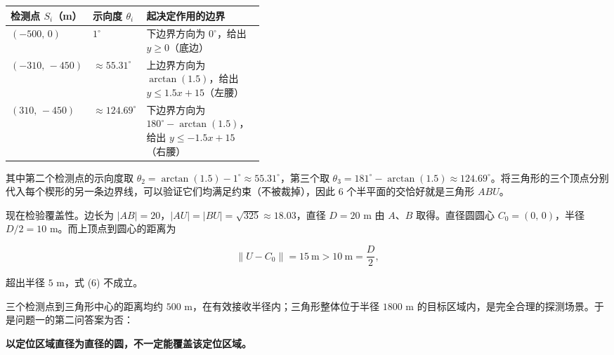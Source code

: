 \documentclass[UTF8,a4paper,zihao=-4,fontset=fandol]{ctexart}
\begin{document}
\begin{center}
\renewcommand{\arraystretch}{1.3}
\begin{tabularx}{0.98\linewidth}{>{\centering\arraybackslash}p{0.22\linewidth}>{\centering\arraybackslash}p{0.20\linewidth}>{\raggedright\arraybackslash}X}
\toprule
\textbf{检测点 $S_i$（m）} & \textbf{示向度 $\theta_i$} & \textbf{起决定作用的边界} \\
\midrule
$(-500,\,0)$ & $1^\circ$ & 下边界方向为 $0^\circ$，给出 $y\ge0$（底边） \\
$(-310,\,-450)$ & $\approx55.31^\circ$ & 上边界方向为 $\arctan(1.5)$，给出 $y\le1.5x+15$（左腰） \\
$(310,\,-450)$ & $\approx124.69^\circ$ & 下边界方向为 $180^\circ-\arctan(1.5)$，给出 $y\le-1.5x+15$（右腰） \\
\bottomrule
\end{tabularx}
\end{center}

其中第二个检测点的示向度取 $\theta_2=\arctan(1.5)-1^\circ\approx55.31^\circ$，第三个取 $\theta_3=181^\circ-\arctan(1.5)\approx124.69^\circ$。将三角形的三个顶点分别代入每个楔形的另一条边界线，可以验证它们均满足约束（不被裁掉），因此 $6$ 个半平面的交恰好就是三角形 $ABU$。

现在检验覆盖性。边长为 $|AB|=20$，$|AU|=|BU|=\sqrt{325}\approx18.03$，直径 $D=20$ m 由 $A$、$B$ 取得。直径圆圆心 $C_0=(0,\,0)$，半径 $D/2=10$ m。而上顶点到圆心的距离为

\[
\|U-C_0\|=15\ \text{m}>10\ \text{m}=\frac D2,
\]

超出半径 $5$ m，式 (6) 不成立。

\begin{center}
\begin{minipage}{\linewidth}
\centering
\QOneCaseFigure
{}
\label{fig:counterexample}
\end{minipage}
\end{center}


三个检测点到三角形中心的距离均约 $500$ m，在有效接收半径内；三角形整体位于半径 $1800$ m 的目标区域内，是完全合理的探测场景。于是问题一的第二问答案为否：

\textbf{以定位区域直径为直径的圆，不一定能覆盖该定位区域。}
\end{document}
